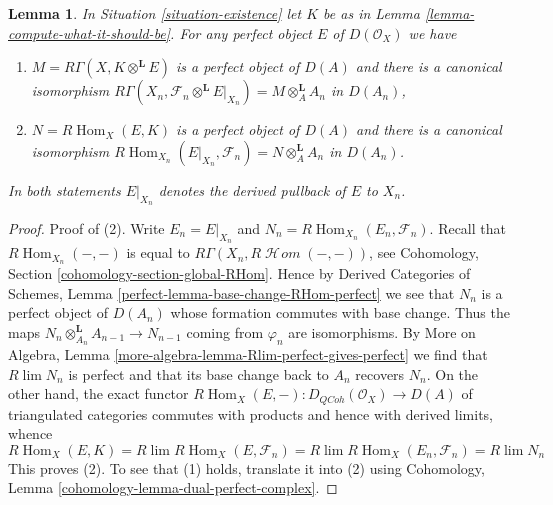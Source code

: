 \documentclass[10pt,a4paper]{amsart}
\theoremstyle{plain}
\newtheorem{lemma}[subsection]{Lemma}
\theoremstyle{definition}
\theoremstyle{remark}
\numberwithin{equation}{subsection}
\def\lim{\mathop{\mathrm{lim}}\nolimits}
\def\Hom{\mathop{\mathrm{Hom}}\nolimits}
\def\SheafHom{\mathop{\mathcal{H}\!\mathit{om}}\nolimits}
\def\QCoh{\mathit{QCoh}}
\begin{document}
\begin{lemma}
\label{lemma-compute-against-perfect}
In Situation \ref{situation-existence} let $K$ be as in
Lemma \ref{lemma-compute-what-it-should-be}. For any perfect
object $E$ of $D(\mathcal{O}_X)$ we have
\begin{enumerate}
\item $M = R\Gamma(X, K \otimes^\mathbf{L} E)$ is a perfect object of $D(A)$
and there is a canonical isomorphism
$R\Gamma(X_n, \mathcal{F}_n \otimes^\mathbf{L} E|_{X_n}) =
M \otimes_A^\mathbf{L} A_n$
in $D(A_n)$,
\item $N = R\Hom_X(E, K)$ is a perfect object of $D(A)$
and there is a canonical isomorphism
$R\Hom_{X_n}(E|_{X_n}, \mathcal{F}_n) = N \otimes_A^\mathbf{L} A_n$
in $D(A_n)$.
\end{enumerate}
In both statements $E|_{X_n}$ denotes the derived pullback
of $E$ to $X_n$.
\end{lemma}

\begin{proof}
Proof of (2). Write $E_n = E|_{X_n}$ and
$N_n = R\Hom_{X_n}(E_n, \mathcal{F}_n)$.
Recall that $R\Hom_{X_n}(-, -)$ is equal to
$R\Gamma(X_n, R\SheafHom(-, -))$, see
Cohomology, Section \ref{cohomology-section-global-RHom}.
Hence by Derived Categories of Schemes, Lemma
\ref{perfect-lemma-base-change-RHom-perfect}
we see that $N_n$ is a perfect object of $D(A_n)$
whose formation commutes with base change. Thus the maps
$N_n \otimes_{A_n}^\mathbf{L} A_{n - 1} \to N_{n - 1}$
coming from $\varphi_n$ are isomorphisms.
By More on Algebra, Lemma \ref{more-algebra-lemma-Rlim-perfect-gives-perfect}
we find that $R\lim N_n$ is perfect and
that its base change back to $A_n$ recovers $N_n$.
On the other hand, the exact functor
$R\Hom_X(E, -) : D_\QCoh(\mathcal{O}_X) \to D(A)$
of triangulated categories commutes with products
and hence with derived limits, whence
$$
R\Hom_X(E, K) =
R\lim R\Hom_X(E, \mathcal{F}_n) =
R\lim R\Hom_X(E_n, \mathcal{F}_n) =
R\lim N_n
$$
This proves (2). To see that (1) holds, translate it into (2)
using Cohomology, Lemma \ref{cohomology-lemma-dual-perfect-complex}.
\end{proof}
\end{document}
